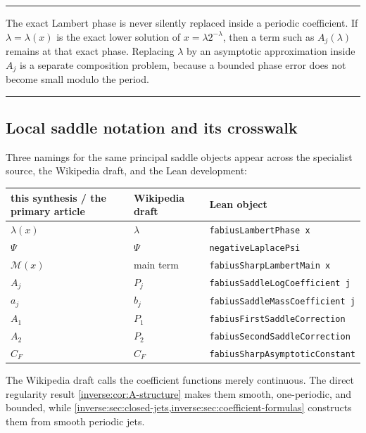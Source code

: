 \documentclass[11pt,oneside]{article}
\theoremstyle{definition}
\theoremstyle{remark}
\newenvironment{boxedremark}{%
  \par\smallskip\noindent\begin{center}\begin{minipage}{0.94\textwidth}%
  \color{black}\hrule\vspace{0.6em}\small
}{%
  \vspace{0.6em}\hrule\end{minipage}\end{center}\smallskip
}
\begin{document}
\begin{boxedremark}
The exact Lambert phase is never silently replaced inside a periodic
coefficient.  If $\lambda=\lambda(x)$ is the exact lower solution of
$x=\lambda2^{-\lambda}$, then a term such as $A_j(\lambda)$ remains at that
exact phase.  Replacing $\lambda$ by an asymptotic approximation inside
$A_j$ is a separate composition problem, because a bounded phase error
does not become small modulo the period.
\end{boxedremark}

\subsection{Local saddle notation and its crosswalk}
\label{inverse:sec:notation-crosswalk}
\label{smallarg:sec:crosswalk}

Three namings for the same principal saddle objects appear across the specialist source, the
Wikipedia draft, and the Lean development:
\begin{center}
\begin{tabular}{@{}lll@{}}
\toprule
this synthesis / the primary article & Wikipedia draft & Lean object\\
\midrule
\(\lambda(x)\) & \(\lambda\) & \nolinkurl{fabiusLambertPhase x}\\
\(\Psi\) & \(\Psi\) & \nolinkurl{negativeLaplacePsi}\\
\(\mathcal M(x)\) & main term & \nolinkurl{fabiusSharpLambertMain x}\\
\(A_j\) & \(P_j\) & \nolinkurl{fabiusSaddleLogCoefficient j}\\
\(a_j\) & \(b_j\) & \nolinkurl{fabiusSaddleMassCoefficient j}\\
\(A_1\) & \(P_1\) & \nolinkurl{fabiusFirstSaddleCorrection}\\
\(A_2\) & \(P_2\) & \nolinkurl{fabiusSecondSaddleCorrection}\\
\(C_F\) & \(C_F\) & \nolinkurl{fabiusSharpAsymptoticConstant}\\
\bottomrule
\end{tabular}
\end{center}

The Wikipedia draft calls the coefficient functions merely continuous.  The direct
regularity result \cref{inverse:cor:A-structure} makes them smooth, one-periodic, and
bounded, while \cref{inverse:sec:closed-jets,inverse:sec:coefficient-formulas} constructs
them from smooth periodic jets.
\end{document}
